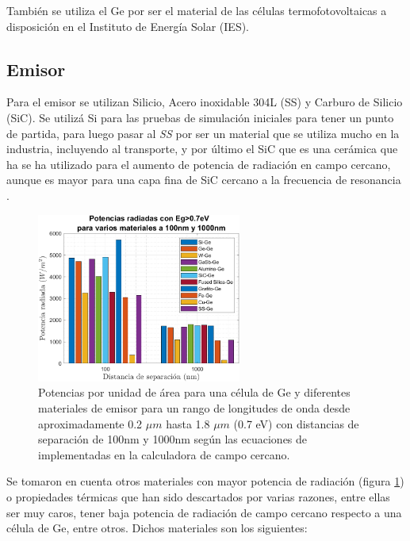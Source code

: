 También se utiliza el Ge por ser el material de las células termofotovoltaicas a disposición en el Instituto de Energía Solar (IES).
\subsection{Emisor}
Para el emisor se utilizan Silicio, Acero inoxidable 304L (SS) y Carburo de Silicio (SiC). Se utilizá Si para las pruebas de simulación iniciales para tener un punto de partida, para luego pasar al \textit{SS} por ser un material que se utiliza mucho en la industria, incluyendo al transporte, y por último el SiC que es una cerámica que ha se ha utilizado para el aumento de potencia de radiación en campo cercano, aunque es mayor para una capa fina de SiC cercano a la frecuencia de resonancia \cite{doi:Near_field_ThinFilm}.
\begin{figure}[H]
	\centering
		\includegraphics[width=0.6\textwidth]{figuras/rad_mat/EgRad.png}
	\caption{Potencias por unidad de área para una célula de Ge y diferentes materiales de emisor para un rango de longitudes de onda desde aproximadamente 0.2 $\mu m$ hasta 1.8 $\mu m$ (0.7 eV) con distancias de separación de 100nm y 1000nm según las ecuaciones de \cite{nfTPV_equations} implementadas en la calculadora de campo cercano.}
	\label{fig:EgRad}
\end{figure}
Se tomaron en cuenta otros materiales con mayor potencia de radiación (figura \ref{fig:EgRad}) o propiedades térmicas que han sido descartados por varias razones, entre ellas ser muy caros, tener baja potencia de radiación de campo cercano respecto a una célula de Ge, entre otros. %
Dichos materiales son los siguientes:

